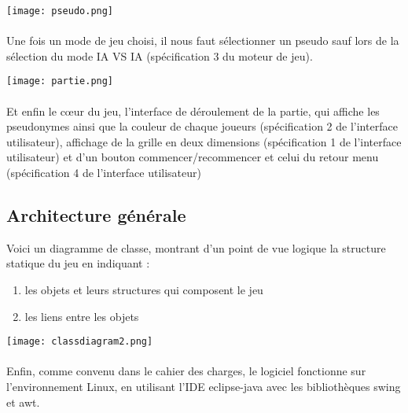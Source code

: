 \documentclass[a4paper,oneside]{article}
\begin{document}
\begin{center}
	\texttt{[image: pseudo.png]}
\end{center}

\paragraph{}
Une fois un mode de jeu choisi, il nous faut sélectionner un pseudo sauf lors de la sélection du mode IA VS IA (spécification 3 du moteur de jeu).

\begin{center}
	\texttt{[image: partie.png]}
\end{center}

\paragraph{}
Et enfin le cœur du jeu, l'interface de déroulement de la partie, qui affiche les pseudonymes ainsi que la couleur de chaque joueurs (spécification 2 de l'interface utilisateur), affichage de la grille en deux dimensions (spécification 1 de l'interface utilisateur) et d'un bouton commencer/recommencer et celui du retour menu (spécification 4 de l'interface utilisateur)

\subsection{Architecture générale}
Voici un diagramme de classe, montrant d'un point de vue logique la structure statique du jeu en indiquant :
\begin{enumerate}
	\item les objets et leurs structures qui composent le jeu
	\item les liens entre les objets
\end{enumerate}

\begin{center}
\texttt{[image: classdiagram2.png]}
\end{center}

\paragraph{}
Enfin, comme convenu dans le cahier des charges, le logiciel fonctionne sur l'environnement Linux, en utilisant l'IDE eclipse-java avec les bibliothèques swing et awt.

\clearpage

\end{document}
